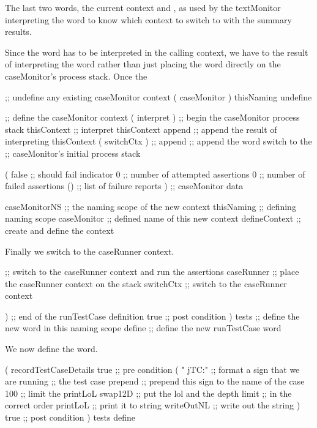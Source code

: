 The last two words, the current context and , as used by the 
textMonitor interpreting the  word to know which context to 
switch to with the summary results. 

Since the  word has to be interpreted in the calling 
context, we have to  the result of interpreting the 
 word rather than just placing the  
word directly on the caseMonitor's process stack. Once the 

\startJoylolCode
    ;; undefine any existing caseMonitor context
    ( caseMonitor )
    thisNaming
    undefine

    ;; define the caseMonitor context
    ( interpret ) ;; begin the caseMonitor process stack
    thisContext   ;; interpret thisContext 
    append        ;; append the result of interpreting thisContext
    ( switchCtx ) ;; 
    append        ;; append the word switch to the
                  ;; caseMonitor's initial process stack
  
    ( 
      false       ;; should fail indicator
      0           ;; number of attempted assertions
      0           ;; number of failed assertions
      ()          ;; list of failure reports
    )             ;; caseMonitor data

    caseMonitorNS ;; the naming scope of the new context
    thisNaming    ;; defining naming scope
    caseMonitor   ;; defined name of this new context
    defineContext ;; create and define the context
\stopJoylolCode

Finally we switch to the caseRunner context.

\startJoylolCode
    ;; switch to the caseRunner context and run the assertions
    caseRunner    ;; place the caseRunner context on the stack
    switchCtx     ;; switch to the caseRunner context
  
  )               ;; end of the runTestCase definition
  { true }        ;; post condition
)
tests             ;; define the new word in this naming scope
define            ;; define the new runTestCase word
\stopJoylolCode

We now define the  word.

\startJoylolCode
(
  recordTestCaseDetails
  { true }      ;; pre condition
  (
    "  jTC:"    ;; format a sign that we are running
                ;; the test case
    prepend     ;; prepend this sign to the name of the case
    100         ;; limit the printLoL
    swap12D     ;; put the lol and the depth limit
                ;; in the correct order
    printLoL    ;; print it to string
    writeOutNL  ;; write out the string
  )
  { true }      ;; post condition
)
tests
define
\stopJoylolCode
\stopTestSuite

